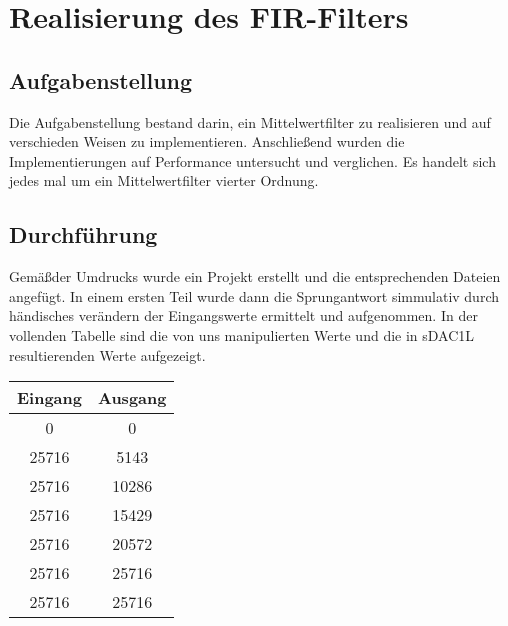 \chapter{Realisierung des FIR-Filters}\label{Cha:RealFIR}
\section{Aufgabenstellung}
Die Aufgabenstellung bestand darin, ein Mittelwertfilter zu realisieren und auf verschieden Weisen zu implementieren. Anschließend wurden die Implementierungen auf Performance untersucht und verglichen. Es handelt sich jedes mal um ein Mittelwertfilter vierter Ordnung.

\section{Durchf\"uhrung}
Gem\"a\ss der Umdrucks wurde ein Projekt erstellt und die entsprechenden Dateien angef\"ugt. In einem ersten Teil wurde dann die Sprungantwort simmulativ durch h\"andisches ver\"andern der Eingangswerte ermittelt und aufgenommen. In der vollenden Tabelle sind die von uns manipulierten Werte und die in sDAC1L resultierenden Werte aufgezeigt.

\begin{tabular}{|c|c|}
\hline 
Eingang & Ausgang \\ 
\hline 
0 & 0 \\ 
\hline 
25716 & 5143 \\ 
\hline 
25716 & 10286 \\ 
\hline 
25716 & 15429 \\ 
\hline 
25716 & 20572 \\ 
\hline 
25716 & 25716 \\ 
\hline 
25716 & 25716 \\ 
\hline 
\end{tabular} 

